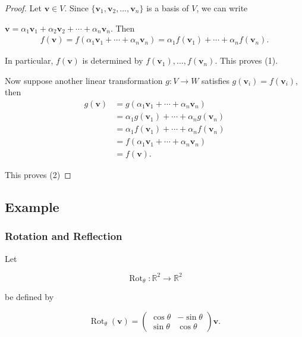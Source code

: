 \documentclass[12pt]{article}
\begin{document}
\begin{proof}

Let $\mathbf{v}\in V$. Since $\{\mathbf{v}_1,\mathbf{v}_2,\ldots,\mathbf{v}_n\}$ is a basis of $V$, we can write

$\mathbf{v}=\alpha_1\mathbf{v}_1+\alpha_2\mathbf{v}_2+\cdots+\alpha_n\mathbf{v}_n$. Then
\[
\begin{aligned}
f(\mathbf{v})=f(\alpha_1\mathbf{v}_1+\cdots+\alpha_n\mathbf{v}_n)=\alpha_1f(\mathbf{v}_1)+\cdots+\alpha_nf(\mathbf{v}_n).
\end{aligned}
\]

In particular, $f(\mathbf{v})$ is determined by $f(\mathbf{v}_1),\ldots,f(\mathbf{v}_n)$. This proves (1).

\medskip

Now suppose another linear transformation $g:V\rightarrow W$ satisfies $g(\mathbf{v}_i)=f(\mathbf{v}_i)$, then
\[
\begin{aligned}
g(\mathbf{v})
&=
g(\alpha_1\mathbf{v}_1+\cdots+\alpha_n\mathbf{v}_n)\\
&=
\alpha_1g(\mathbf{v}_1)+\cdots+\alpha_ng(\mathbf{v}_n)\\
&=
\alpha_1f(\mathbf{v}_1)+\cdots+\alpha_nf(\mathbf{v}_n)\\
&=
f(\alpha_1\mathbf{v}_1+\cdots+\alpha_n\mathbf{v}_n)\\
&=
f(\mathbf{v}).
\end{aligned}
\]

This proves (2)

\end{proof}

\subsection{Example}

\subsubsection{Rotation and Reflection}

Let

\[
\operatorname{Rot}_{\theta}:\mathbb{R}^2\rightarrow\mathbb{R}^2
\]

be defined by

\[
\operatorname{Rot}_{\theta}(\mathbf{v})
=
\begin{pmatrix}
\cos\theta & -\sin\theta\\
\sin\theta & \cos\theta
\end{pmatrix}
\mathbf{v}.
\]
\end{document}
